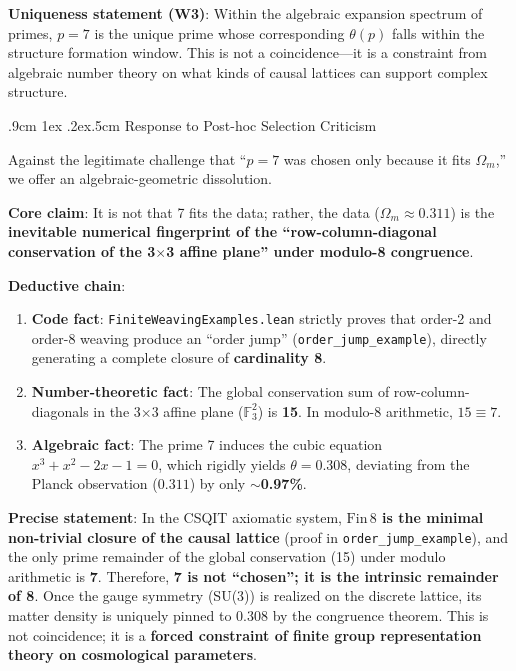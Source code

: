 \documentclass[aps,prd,twocolumn,nofootinbib,floatfix]{revtex4-2}
\makeatletter
\def\subsection{%
  \@startsection{subsection}{2}{\z@}
    {.9cm \@plus1ex \@minus .2ex}{.5cm}
    {\normalfont\normalsize\bfseries\centering}%
}
\makeatother
\begin{document}
\textbf{Uniqueness statement (W3)}: Within the algebraic expansion spectrum of primes, $p=7$ is the unique prime whose corresponding $\theta(p)$ falls within the structure formation window. This is not a coincidence---it is a constraint from algebraic number theory on what kinds of causal lattices can support complex structure.

\subsection{Response to Post-hoc Selection Criticism}

Against the legitimate challenge that ``$p=7$ was chosen only because it fits $\Omega_m$,'' we offer an algebraic-geometric dissolution.

\textbf{Core claim}: It is not that 7 fits the data; rather, the data ($\Omega_m \approx 0.311$) is the \textbf{inevitable numerical fingerprint of the ``row-column-diagonal conservation of the 3$\times$3 affine plane'' under modulo-8 congruence}.

\textbf{Deductive chain}:
\begin{enumerate}
    \item \textbf{Code fact}: \texttt{FiniteWeavingExamples.lean} strictly proves that order-2 and order-8 weaving produce an ``order jump'' (\texttt{order\_jump\_example}), directly generating a complete closure of \textbf{cardinality 8}.
    \item \textbf{Number-theoretic fact}: The global conservation sum of row-column-diagonals in the 3$\times$3 affine plane ($\mathbb{F}_3^2$) is \textbf{15}. In modulo-8 arithmetic, $15 \equiv 7$.
    \item \textbf{Algebraic fact}: The prime 7 induces the cubic equation $x^3 + x^2 - 2x - 1 = 0$, which rigidly yields $\theta = 0.308$, deviating from the Planck observation ($0.311$) by only \textbf{$\sim$0.97\%}.
\end{enumerate}

\textbf{Precise statement}: In the CSQIT axiomatic system, \textbf{$\text{Fin}\,8$ is the minimal non-trivial closure of the causal lattice} (proof in \texttt{order\_jump\_example}), and the only prime remainder of the global conservation (15) under modulo arithmetic is \textbf{7}. Therefore, \textbf{7 is not ``chosen''; it is the intrinsic remainder of 8}. Once the gauge symmetry (SU(3)) is realized on the discrete lattice, its matter density is uniquely pinned to 0.308 by the congruence theorem. This is not coincidence; it is a \textbf{forced constraint of finite group representation theory on cosmological parameters}.
\end{document}
